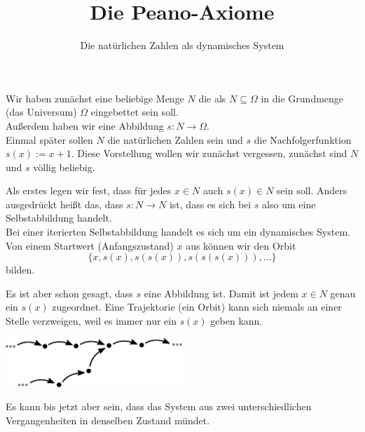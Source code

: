 \documentclass[9pt]{beamer}
\title{Die Peano-Axiome}
\subtitle{Die natürlichen Zahlen als dynamisches System}
\date{}
\newcommand{\imgcaption}[1]{{\small #1}}
\begin{document}
\renewcommand*{\figurename}{Abb.}

\begin{frame}

\maketitle

\end{frame}

\begin{frame}
Wir haben zunächst eine beliebige Menge $N$ die als $N\subseteq\Omega$
in die Grundmenge (das Universum) $\Omega$ eingebettet sein soll.\\[1em]

Außerdem haben wir eine Abbildung $s\colon N\to\Omega$.\\[1em]

Einmal später sollen $N$ die natürlichen Zahlen sein und $s$ die
Nachfolgerfunktion $s(x):=x+1$. Diese Vorstellung wollen wir zunächst
vergessen, zunächst sind $N$ und $s$ völlig beliebig.
\end{frame}

\begin{frame}
Als erstes legen wir fest, dass für jedes $x\in N$ auch $s(x)\in N$
sein soll. Anders ausgedrückt heißt das, dass $s\colon N\to N$ ist,
dass es sich bei $s$ also um eine Selbstabbildung handelt.\\[1em]

Bei einer iterierten Selbstabbildung handelt es sich um ein dynamisches
System. Von einem Startwert (Anfangszustand) $x$ aus können wir den Orbit
\[\{x,s(x),s(s(x)),s(s(s(x))),\ldots\}\]
bilden.
\end{frame}

\begin{frame}
Es ist aber schon gesagt, dass $s$ eine Abbildung ist. Damit ist jedem
$x\in N$ genau ein $s(x)$ zugeordnet. Eine Trajektorie (ein Orbit)
kann sich niemals an einer Stelle verzweigen, weil es immer nur
ein $s(x)$ geben kann.
\end{frame}

\begin{frame}
\begin{center}
\includegraphics[width=0.5\textwidth]{img/Nichtinvertierbares-System.pdf}
\end{center}
\imgcaption{Es kann bis jetzt aber sein, dass das System aus zwei
unterschiedlichen Vergangenheiten in denselben Zustand mündet.}
\end{frame}
\end{document}
